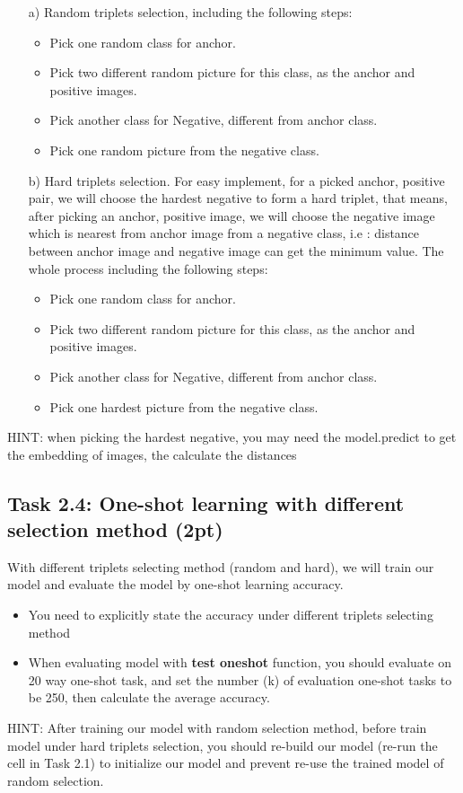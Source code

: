 \documentclass[a4paper,twoside,10pt]{article}
\begin{document}
	\begin{itemize} 
		\item[a)] Random  triplets selection, including the following steps:
		
		\begin{itemize}
			\item Pick one random class for anchor.
			\item Pick two different random picture for this class, as the anchor and positive images.
			\item Pick another class for Negative, different from anchor class.
			\item Pick one random picture from the negative class.
		\end{itemize}
		
		
		\item[b)] Hard triplets selection. For easy implement, for a picked anchor, positive pair, we will choose the hardest negative to form a hard triplet, that means, after picking an anchor, positive image, we will choose the negative image which is nearest from anchor image from a negative class, i.e : distance between anchor image and negative image  can get the minimum value. The whole process including the following steps:
		
		\begin{itemize}
			\item Pick one random class for anchor.
			\item Pick two different random picture for this class, as the anchor and positive images.
			\item Pick another class for Negative, different from anchor class.
			\item Pick one hardest picture from the negative class.
		\end{itemize}
		
		
	\end{itemize}
	HINT: when picking the hardest negative, you may need the model.predict to get the embedding of images, the calculate the distances
	
	
	
	
	\subsection*{Task 2.4: One-shot learning with different selection method (2pt)}
	
	With different triplets selecting method (random and hard), we will train our model and evaluate the model by one-shot learning accuracy.
	\begin{itemize}
		\item You need to explicitly state the accuracy under different  triplets selecting method
		\item  When evaluating model with \textbf{test oneshot} function,  you should evaluate on 20 way one-shot task, and set the number (k) of evaluation one-shot tasks to be 250, then calculate the average accuracy.
	\end{itemize}
	HINT: After training our model with random selection method, before train model under hard triplets selection, you should re-build our model (re-run the cell in Task 2.1) to initialize our model and prevent re-use the trained model of random selection.
	
\end{document}
